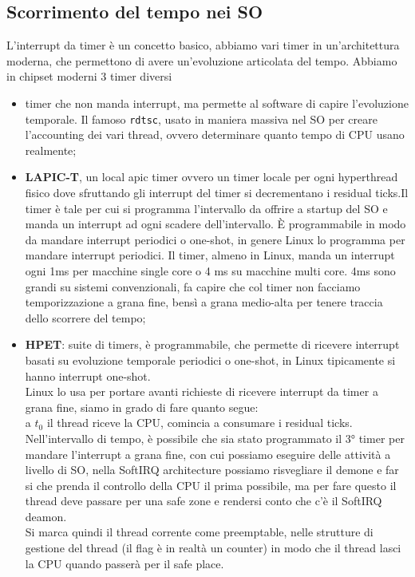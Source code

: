 \documentclass[12pt, oneside]{extbook}
\begin{document}
\subsection{Scorrimento del tempo nei SO}
L'interrupt da timer è un concetto basico, abbiamo vari timer in un'architettura moderna, che permettono di avere un'evoluzione articolata del tempo. Abbiamo in chipset moderni 3 timer diversi
\begin{itemize}
\item timer che non manda interrupt, ma permette al software di capire l'evoluzione temporale. Il famoso \texttt{rdtsc}, usato in maniera massiva nel SO per creare l'accounting dei vari thread, ovvero determinare quanto tempo di CPU usano realmente;
\item \textbf{LAPIC-T}, un local apic timer ovvero un timer locale per ogni hyperthread fisico dove sfruttando gli interrupt del timer si decrementano i residual ticks.Il timer è tale per cui si programma l'intervallo da offrire a startup del SO e manda un interrupt ad ogni scadere dell'intervallo. È programmabile in modo da mandare interrupt periodici o one-shot, in genere Linux lo programma per mandare interrupt periodici. Il timer, almeno in Linux, manda un interrupt ogni 1ms per macchine single core o 4 ms su macchine multi core. 4ms sono grandi su sistemi convenzionali, fa capire che col timer non facciamo temporizzazione a grana fine, bensì a grana medio-alta per tenere traccia dello scorrere del tempo;
\item \textbf{HPET}: suite di timers, è programmabile, che permette di ricevere interrupt basati su evoluzione temporale periodici o one-shot, in Linux tipicamente si hanno interrupt one-shot.\\Linux lo usa per portare avanti richieste di ricevere interrupt da timer a grana fine, siamo in grado di fare quanto segue:\\
a $t_0$ il thread riceve la CPU, comincia a consumare i residual ticks. Nell'intervallo di tempo, è possibile che sia stato programmato il 3° timer per mandare l'interrupt a grana fine, con cui possiamo eseguire delle attività a livello di SO, nella SoftIRQ architecture possiamo risvegliare il demone e far si che prenda il controllo della CPU il prima possibile, ma per fare questo il thread deve passare per una safe zone e rendersi conto che c'è il SoftIRQ deamon.\\Si marca quindi il thread corrente come preemptable, nelle strutture di gestione del thread (il flag è in realtà un counter) in modo che il thread lasci la CPU quando passerà per il safe place. 
\end{itemize}
\end{document}
